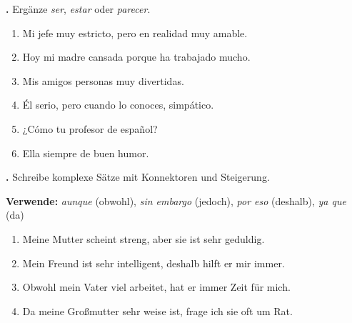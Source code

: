 \documentclass[11pt,a4paper]{article}
\newcommand{\luecke}[1]{\underline{\hspace{#1}}}
\newcommand{\punktebox}[1]{\hfill\fbox{\small \_\_/#1}}
\newcommand{\es}[1]{\textit{#1}}
\newcounter{aufgabe}
\newcommand{\aufgabe}[2]{%
    \stepcounter{aufgabe}%
    \vspace{0.8em}%
    \noindent\textbf{\theaufgabe.} #1 \punktebox{#2}%
    \vspace{0.3em}%
}
\begin{document}
\vspace{0.8em}

\aufgabe{Ergänze \es{ser}, \es{estar} oder \es{parecer}.}{6}

\begin{enumerate}[label=\alph*), leftmargin=2em]
    \item Mi jefe \luecke{2cm} muy estricto, pero en realidad \luecke{2cm} muy amable.
    \item Hoy mi madre \luecke{2cm} cansada porque ha trabajado mucho.
    \item Mis amigos \luecke{2cm} personas muy divertidas.
    \item Él \luecke{2cm} serio, pero cuando lo conoces, \luecke{2cm} simpático.
    \item ¿Cómo \luecke{2cm} tu profesor de español?
    \item Ella siempre \luecke{2cm} de buen humor.
\end{enumerate}

\vspace{0.8em}

\aufgabe{Schreibe komplexe Sätze mit Konnektoren und Steigerung.}{8}

\begin{tippbox}
\textbf{Verwende:} \es{aunque} (obwohl), \es{sin embargo} (jedoch), \es{por eso} (deshalb), \es{ya que} (da)
\end{tippbox}

\vspace{0.3em}
\begin{enumerate}[label=\alph*), leftmargin=2em]
    \item Meine Mutter scheint streng, aber sie ist sehr geduldig.

    \vspace{0.3cm}
    \luecke{13cm}

    \item Mein Freund ist sehr intelligent, deshalb hilft er mir immer.

    \vspace{0.3cm}
    \luecke{13cm}

    \item Obwohl mein Vater viel arbeitet, hat er immer Zeit für mich.

    \vspace{0.3cm}
    \luecke{13cm}

    \item Da meine Großmutter sehr weise ist, frage ich sie oft um Rat.

    \vspace{0.3cm}
    \luecke{13cm}
\end{enumerate}
\end{document}
